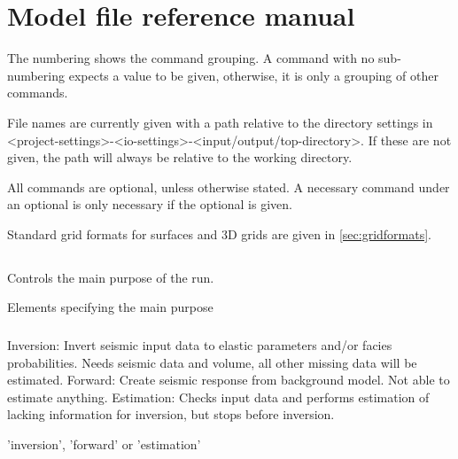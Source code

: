 \chapter{Model file reference manual}
\label{ap:model-file-reference}
The numbering shows the command grouping. A command with no sub-numbering expects a value to be given, otherwise, it is only a grouping of other commands.

File names are currently given with a path relative to the directory settings in <project-settings>-<io-settings>-<input/output/top-directory>. If these are not given, the path will always be relative to the working directory.

All commands are optional, unless otherwise stated. A necessary command under an optional is only necessary if the optional is given.

Standard grid formats for surfaces and 3D grids are given in \autoref{sec:gridformats}.


\section{\necessary} 
 \slist
   \item \Description Controls the main purpose of the run.
   \item \Argument Elements specifying the main purpose
 \elist

\subsection{\necessary}  
 \slist
   \item \Description Inversion: Invert seismic input data to elastic parameters and/or facies probabilities. Needs seismic data and volume, all other missing data will be estimated.
Forward: Create seismic response from background model. Not able to estimate anything.
Estimation: Checks input data and performs estimation of lacking information for inversion, but stops before inversion.
   \item \Argument 'inversion', 'forward' or 'estimation'
 \elist

